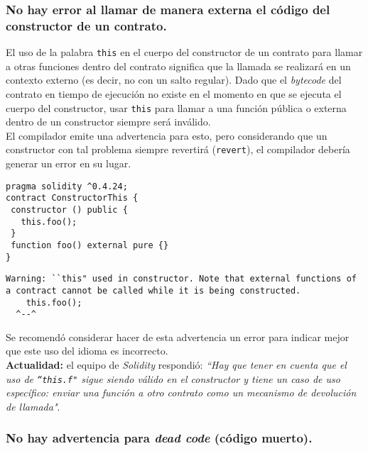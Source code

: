 \subsubsection{No hay error al llamar de manera externa el código del constructor de un contrato.}

El uso de la palabra \texttt{this} en el cuerpo del constructor de un contrato para llamar a otras funciones dentro del contrato significa que la llamada se realizará en un contexto externo (es decir, no con un salto regular). Dado que el \textit{bytecode} del contrato en tiempo de ejecución no existe en el momento en que se ejecuta el cuerpo del constructor, usar \texttt{this} para llamar a una función pública o externa dentro de un constructor siempre será inválido.\\

El compilador emite una advertencia para esto, pero considerando que un constructor con tal problema siempre revertirá (\texttt{revert}), el compilador debería generar un error en su lugar.\\

\begin{lstlisting}[language=Solidity, caption={Código de ejemplo que debería emitir error}]
pragma solidity ^0.4.24;
contract ConstructorThis {
 constructor () public {
   this.foo();
 }
 function foo() external pure {}
}
\end{lstlisting}

\begin{lstlisting}[caption={Mensaje de salida emitiendo advertencia}]
Warning: ``this" used in constructor. Note that external functions of a contract cannot be called while it is being constructed.
	this.foo();
  ^--^
\end{lstlisting}  

Se recomendó considerar hacer de esta advertencia un error para indicar mejor que este uso del idioma es incorrecto.\\

\textbf{Actualidad:} el equipo de \textit{Solidity} respondió: \textit{``Hay que tener en cuenta que el uso de \texttt{``this.f"} sigue siendo válido en el constructor y tiene un caso de uso específico: enviar una función a otro contrato como un mecanismo de devolución de llamada"}.\\

\subsubsection{No hay advertencia para \textit{dead code} (código muerto).}


